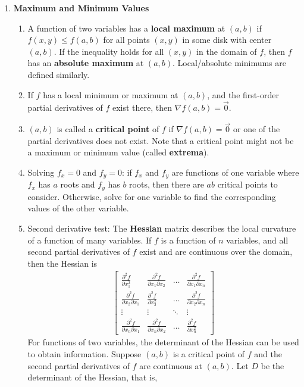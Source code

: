 \documentclass[10pt]{article}
\begin{document}
\begin{multicols*}{2}
\begin{enumerate}
    \item \textbf{Maximum and Minimum Values}
    \begin{enumerate}
        \item A function of two variables has a \textbf{local maximum} at $(a,b)$ if $f(x,y) \leq f(a,b)$ for all points $(x,y)$ in some disk with center $(a,b)$. If the inequality holds for all $(x,y)$ in the domain of $f$, then $f$ has an \textbf{absolute maximum} at $(a,b)$. Local/absolute minimums are defined similarly.
        \item If $f$ has a local minimum or maximum at $(a,b)$, and the first-order partial derivatives of $f$ exist there, then $\nabla f(a,b) = \vec{0}$.
        \item $(a,b)$ is called a \textbf{critical point} of $f$ if $\nabla f(a,b) = \vec{0}$ or one of the partial derivatives does not exist. Note that a critical point might not be a maximum or minimum value (called \textbf{extrema}).
        \item Solving $f_x = 0$ and $f_y = 0$: if $f_x$ and $f_y $ are functions of one variable where $f_x$ has $a$ roots and $f_y$ has $b$ roots, then there are $ab$ critical points to consider. Otherwise, solve for one variable to find the corresponding values of the other variable.
        \item Second derivative test: The \textbf{Hessian} matrix describes the local curvature of a function of many variables. If $f$ is a function of $n$ variables, and all second partial derivatives of $f$ exist and are continuous over the domain, then the Hessian is
        \begin{align*}
            \begin{bmatrix} 
            \frac{\partial^2 f}{\partial x_1^2} & \frac{\partial^2 f}{\partial x_1 \partial x_2} & \hdots & \frac{\partial^2 f}{\partial x_1 \partial x_n} \\[8 pt]
            \frac{\partial^2 f}{\partial x_2\partial x_1} & \frac{\partial^2 f}{\partial x^2_2} & \hdots & \frac{\partial^2 f}{\partial x_2 \partial x_n} \\[4 pt] 
            \vdots & \vdots & \ddots & \vdots \\[4 pt]
            \frac{\partial^2 f}{\partial x_n\partial x_1} & \frac{\partial^2 f}{\partial x_n \partial x_2} & \hdots & \frac{\partial^2 f}{\partial x^2_n}
            \end{bmatrix}
        \end{align*}
        For functions of two variables, the determinant of the Hessian can be used to obtain information. Suppose $(a,b)$ is a critical point of $f$ and the second partial derivatives of $f$ are continuous at $(a,b)$. Let $D$ be the determinant of the Hessian, that is,

\end{enumerate}
\end{enumerate}
\end{multicols*}
\end{document}
